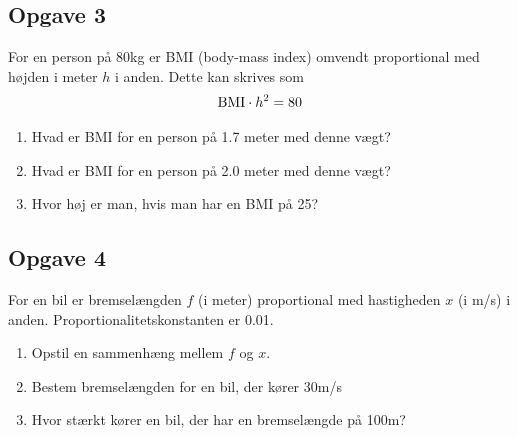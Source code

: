 \subsection*{Opgave 3}
For en person på 80kg er BMI (body-mass index) omvendt proportional med højden i meter $h$ i anden. Dette kan skrives som
\begin{align*}
	\textnormal{BMI} \cdot h^2 = 80
\end{align*}
\begin{enumerate}[label=\roman*)]
	\item Hvad er BMI for en person på 1.7 meter med denne vægt?
	\item Hvad er BMI for en person på 2.0 meter med denne vægt?
	\item Hvor høj er man, hvis man har en BMI på 25?
\end{enumerate}

\subsection*{Opgave 4}
For en bil er bremselængden $f$ (i meter) proportional med hastigheden $x$ (i m/s) i anden. Proportionalitetskonstanten er 0.01.

\begin{enumerate}[label=\roman*)]
	\item Opstil en sammenhæng mellem $f$ og $x$.
	\item Bestem bremselængden for en bil, der kører 30m/s
	\item Hvor stærkt kører en bil, der har en bremselængde på 100m?
\end{enumerate}
